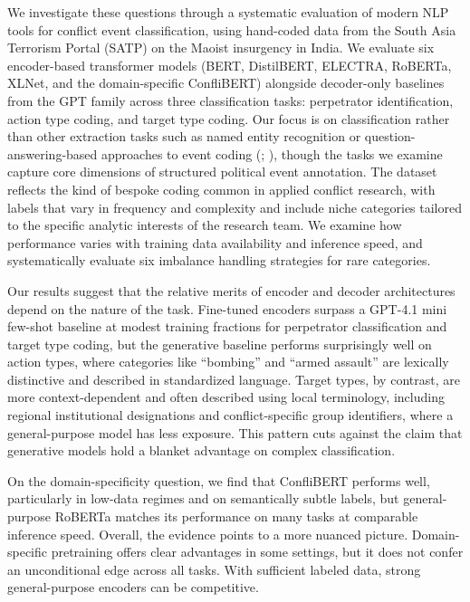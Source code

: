 \documentclass[
  11pt,
]{article}
\begin{document}
We investigate these questions through a systematic evaluation of modern
NLP tools for conflict event classification, using hand-coded data from
the South Asia Terrorism Portal (SATP) on the Maoist insurgency in
India. We evaluate six encoder-based transformer models (BERT,
DistilBERT, ELECTRA, RoBERTa, XLNet, and the domain-specific ConfliBERT)
alongside decoder-only baselines from the GPT family across three
classification tasks: perpetrator identification, action type coding,
and target type coding. Our focus is on classification rather than other
extraction tasks such as named entity recognition or
question-answering-based approaches to event coding
(;
), though the tasks
we examine capture core dimensions of structured political event
annotation. The dataset reflects the kind of bespoke coding common in
applied conflict research, with labels that vary in frequency and
complexity and include niche categories tailored to the specific
analytic interests of the research team. We examine how performance
varies with training data availability and inference speed, and
systematically evaluate six imbalance handling strategies for rare
categories.

Our results suggest that the relative merits of encoder and decoder
architectures depend on the nature of the task. Fine-tuned encoders
surpass a GPT-4.1 mini few-shot baseline at modest training fractions
for perpetrator classification and target type coding, but the
generative baseline performs surprisingly well on action types, where
categories like ``bombing'' and ``armed assault'' are lexically
distinctive and described in standardized language. Target types, by
contrast, are more context-dependent and often described using local
terminology, including regional institutional designations and
conflict-specific group identifiers, where a general-purpose model has
less exposure. This pattern cuts against the claim that generative
models hold a blanket advantage on complex classification.

On the domain-specificity question, we find that ConfliBERT performs
well, particularly in low-data regimes and on semantically subtle
labels, but general-purpose RoBERTa matches its performance on many
tasks at comparable inference speed. Overall, the evidence points to a
more nuanced picture. Domain-specific pretraining offers clear
advantages in some settings, but it does not confer an unconditional
edge across all tasks. With sufficient labeled data, strong
general-purpose encoders can be competitive.
\end{document}
